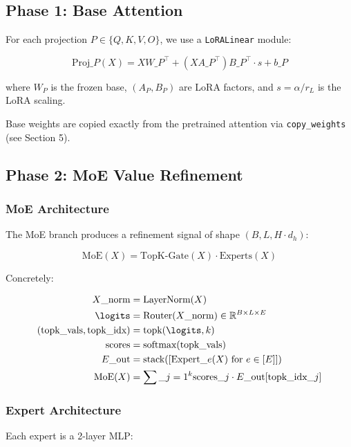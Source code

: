 \subsection{Phase 1: Base Attention}

For each projection $P \in \{Q, K, V, O\}$, we use a \texttt{LoRALinear} module:

\[
\text{Proj}\_P(X) = X W\_P^\top + (X A\_P^\top) B\_P^\top \cdot s + b\_P
\]

where $W_P$ is the frozen base, $(A_P, B_P)$ are LoRA factors, and 
$s = \alpha/r_L$ is the LoRA scaling.

Base weights are copied exactly from the pretrained attention via 
\texttt{copy\_weights} (see Section 5).

\subsection{Phase 2: MoE Value Refinement}

\subsubsection{MoE Architecture}

The MoE branch produces a refinement signal of shape 
$(B, L, H \cdot d_h)$:

\[
\text{MoE}(X) = \text{TopK-Gate}(X) \cdot \text{Experts}(X)
\]

Concretely:

\[
\begin{aligned}
X\_\text{norm} &= \text{LayerNorm}(X) \\
\logits &= \text{Router}(X\_\text{norm}) \in \mathbb{R}^{B \times L \times E} \\
(\text{topk\_vals}, \text{topk\_idx}) &= \text{topk}(\logits, k) \\
\text{scores} &= \text{softmax}(\text{topk\_vals}) \\
E\_\text{out} &= \text{stack}([\text{Expert}\_e(X) \text{ for } e \in [E]]) \\
\text{MoE}(X) &= \sum\_{j=1}^{k} \text{scores}\_j \cdot E\_\text{out}[\text{topk\_idx}\_j]
\end{aligned}
\]

\subsubsection{Expert Architecture}

Each expert is a 2-layer MLP:

